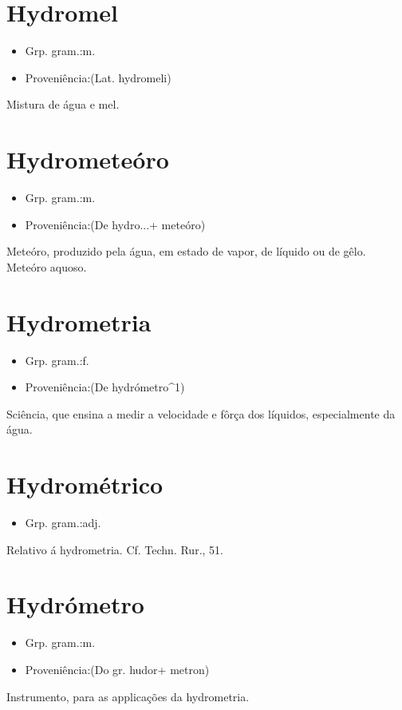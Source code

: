 \documentclass{article}
\begin{document}
\section{Hydromel}
\begin{itemize}
\item {Grp. gram.:m.}
\end{itemize}
\begin{itemize}
\item {Proveniência:(Lat. \textunderscore hydromeli\textunderscore )}
\end{itemize}
Mistura de água e mel.
\section{Hydrometeóro}
\begin{itemize}
\item {Grp. gram.:m.}
\end{itemize}
\begin{itemize}
\item {Proveniência:(De \textunderscore hydro...\textunderscore  + \textunderscore meteóro\textunderscore )}
\end{itemize}
Meteóro, produzido pela água, em estado de vapor, de líquido ou de gêlo.
Meteóro aquoso.
\section{Hydrometria}
\begin{itemize}
\item {Grp. gram.:f.}
\end{itemize}
\begin{itemize}
\item {Proveniência:(De \textunderscore hydrómetro\textunderscore ^1)}
\end{itemize}
Sciência, que ensina a medir a velocidade e fôrça dos líquidos, especialmente da água.
\section{Hydrométrico}
\begin{itemize}
\item {Grp. gram.:adj.}
\end{itemize}
Relativo á hydrometria. Cf. \textunderscore Techn. Rur.\textunderscore , 51.
\section{Hydrómetro}
\begin{itemize}
\item {Grp. gram.:m.}
\end{itemize}
\begin{itemize}
\item {Proveniência:(Do gr. \textunderscore hudor\textunderscore  + \textunderscore metron\textunderscore )}
\end{itemize}
Instrumento, para as applicações da hydrometria.
\end{document}
